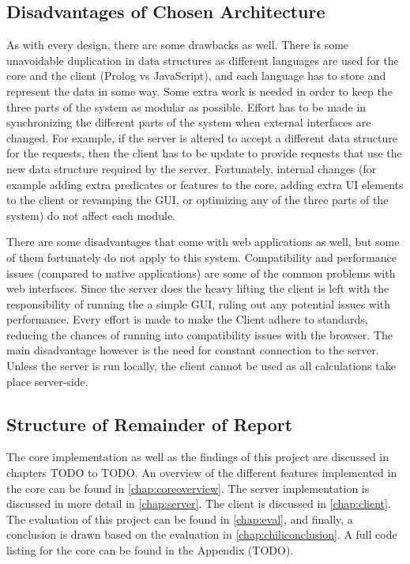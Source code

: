 \documentclass[11pt,twoside,a4paper]{report}
\begin{document}
\subsection{Disadvantages of Chosen Architecture}
As with every design, there are some drawbacks as well. There is some unavoidable duplication in data structures as different languages are used for the core and the client (Prolog vs JavaScript), and each language has to store and represent the data in some way. Some extra work is needed in order to keep the three parts of the system as modular as possible. Effort has to be made in synchronizing the different parts of the system when external interfaces are changed. For example, if the server is altered to accept a different data structure for the requests, then the client has to be update to provide requests that use the new data structure required by the server. Fortunately, internal changes (for example adding extra predicates or features to the core, adding extra UI elements to the client or revamping the GUI, or optimizing any of the three parts of the system) do not affect each module.

There are some disadvantages that come with web applications as well, but some of them fortunately do not apply to this system. Compatibility and performance issues (compared to native applications) are some of the common problems with web interfaces. Since the server does the heavy lifting the client is left with the responsibility of running the a simple GUI, ruling out any potential issues with performance. Every effort is made to make the Client adhere to standards, reducing the chances of running into compatibility issues with the browser. The main disadvantage however is the need for constant connection to the server. Unless the server is run locally, the client cannot be used as all calculations take place server-side.

\subsection{Structure of Remainder of Report}
The core implementation as well as the findings of this project are discussed in chapters TODO to TODO. An overview of the different features implemented in the core can be found in \autoref{chap:coreoverview}. The server implementation is discussed in more detail in \autoref{chap:server}. The client is discussed in \autoref{chap:client}. The evaluation of this project can be found in \autoref{chap:eval}, and finally, a conclusion is drawn based on the evaluation in \autoref{chap:chiliconclusion}. A full code listing for the core can be found in the Appendix (TODO).
\end{document}
